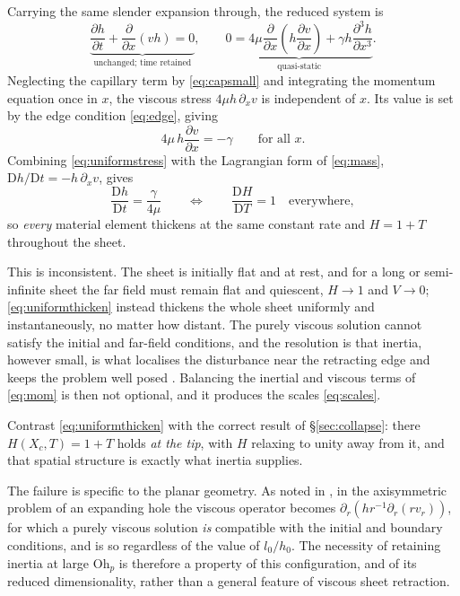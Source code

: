 \documentclass[11pt,a4paper]{article}
\newcommand{\Xc}{X_{c}}
\newcommand{\Ohp}{\mathrm{Oh}_{p}}
\begin{document}
Carrying the same slender expansion through, the reduced system is
%
\begin{equation}
  \underbrace{\frac{\partial h}{\partial t}
    + \frac{\partial}{\partial x}(v h) = 0}_{\text{unchanged; time retained}},
  \qquad
  \underbrace{0 = 4\mu \frac{\partial}{\partial x}
      \left( h \frac{\partial v}{\partial x} \right)
      + \gamma h \frac{\partial^{3} h}{\partial x^{3}}}_{\text{quasi-static}} .
  \label{eq:stokes1d}
\end{equation}
%
Neglecting the capillary term by \eqref{eq:capsmall} and integrating the
momentum equation once in $x$, the viscous stress $4\mu h\,\partial_{x}v$ is
independent of $x$. Its value is set by the edge condition \eqref{eq:edge},
giving
%
\begin{equation}
  4\mu\, h \frac{\partial v}{\partial x} = -\gamma
  \qquad \text{for all } x .
  \label{eq:uniformstress}
\end{equation}
%
Combining \eqref{eq:uniformstress} with the Lagrangian form of \eqref{eq:mass},
$\mathrm{D}h/\mathrm{D}t = -h\,\partial_{x}v$, gives
%
\begin{equation}
  \frac{\mathrm{D} h}{\mathrm{D} t} = \frac{\gamma}{4\mu}
  \qquad \Longleftrightarrow \qquad
  \frac{\mathrm{D} H}{\mathrm{D} T} = 1
  \quad \text{everywhere},
  \label{eq:uniformthicken}
\end{equation}
%
so \emph{every} material element thickens at the same constant rate and
$H = 1 + T$ throughout the sheet.

This is inconsistent. The sheet is initially flat and at rest, and for a long
or semi-infinite sheet the far field must remain flat and quiescent,
$H \to 1$ and $V \to 0$; \eqref{eq:uniformthicken} instead thickens the whole
sheet uniformly and instantaneously, no matter how distant. The purely viscous
solution cannot satisfy the initial and far-field conditions, and the
resolution is that inertia, however small, is what localises the
disturbance near the retracting edge and keeps the problem well posed
\cite{ahsan2025}. Balancing the inertial and viscous terms of \eqref{eq:mom} is
then not optional, and it produces the scales \eqref{eq:scales}.

Contrast \eqref{eq:uniformthicken} with the correct result of
\S\ref{sec:collapse}: there $H(\Xc,T) = 1+T$ holds \emph{at the tip}, with $H$
relaxing to unity away from it, and that spatial structure is exactly what
inertia supplies.

The failure is specific to the planar geometry. As noted in \cite{ahsan2025},
in the axisymmetric problem of an expanding hole the viscous operator becomes
$\partial_{r}\!\left(h r^{-1} \partial_{r}(r v_{r})\right)$, for which a purely
viscous solution \emph{is} compatible with the initial and boundary conditions,
and is so regardless of the value of $l_{0}/h_{0}$. The necessity of retaining
inertia at large $\Ohp$ is therefore a property of this configuration, and of
its reduced dimensionality, rather than a general feature of viscous sheet
retraction.
\end{document}
